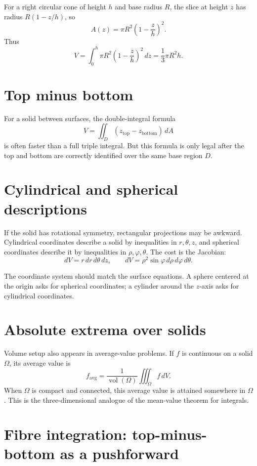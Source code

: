 \begin{example}
For a right circular cone of height \(h\) and base radius \(R\), the slice at height \(z\) has radius \(R(1-z/h)\), so
\[
  A(z)=\pi R^2\left(1-\frac{z}{h}\right)^2.
\]
Thus
\[
  V=\int_0^h \pi R^2\left(1-\frac{z}{h}\right)^2\,dz
  =\frac{1}{3}\pi R^2h.
\]
\end{example}

\section{Top minus bottom}

For a solid between surfaces, the double-integral formula
\[
  V=\iint_D(z_{\mathrm{top}}-z_{\mathrm{bottom}})\,dA
\]
is often faster than a full triple integral.  But this formula is only legal after the top and bottom are correctly identified over the same base region \(D\).

\section{Cylindrical and spherical descriptions}

If the solid has rotational symmetry, rectangular projections may be awkward.  Cylindrical coordinates describe a solid by inequalities in \(r,\theta,z\), and spherical coordinates describe it by inequalities in \(\rho,\varphi,\theta\).  The cost is the Jacobian:
\[
  dV=r\,dr\,d\theta\,dz,\qquad
  dV=\rho^2\sin\varphi\,d\rho\,d\varphi\,d\theta.
\]

The coordinate system should match the surface equations.  A sphere centered at the origin asks for spherical coordinates; a cylinder around the \(z\)-axis asks for cylindrical coordinates.

\section{Absolute extrema over solids}

Volume setup also appears in average-value problems.  If \(f\) is continuous on a solid \(\Omega\), its average value is
\[
  f_{\mathrm{avg}}=\frac{1}{\operatorname{vol}(\Omega)}\iiint_{\Omega}f\,dV.
\]
When \(\Omega\) is compact and connected, this average value is attained somewhere in \(\Omega\).  This is the three-dimensional analogue of the mean-value theorem for integrals.

\section{Fibre integration: top-minus-bottom as a pushforward}

